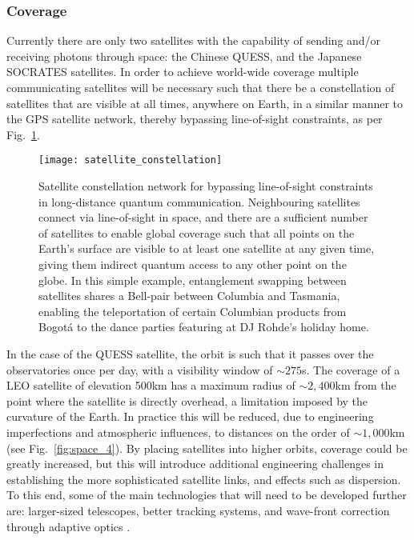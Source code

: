 %
%

\subsubsection{Coverage}

Currently there are only two satellites with the capability of sending and/or receiving photons through space: the Chinese QUESS, and the Japanese SOCRATES satellites. In order to achieve world-wide coverage multiple communicating satellites will be necessary such that there be a constellation of satellites that are visible at all times, anywhere on Earth, in a similar manner to the GPS satellite network, thereby bypassing line-of-sight constraints, as per Fig.~\ref{fig:sat_constellation}.

\begin{figure}[!htb]
	\texttt{[image: satellite\_constellation]}
	\caption{Satellite constellation network for bypassing line-of-sight constraints in long-distance quantum communication. Neighbouring satellites connect via line-of-sight in space, and there are a sufficient number of satellites to enable global coverage such that all points on the Earth's surface are visible to at least one satellite at any given time, giving them indirect quantum access to any other point on the globe. In this simple example, entanglement swapping between satellites shares a Bell-pair between Columbia and Tasmania, enabling the teleportation of certain Columbian products from Bogot{\'a} to the dance parties featuring at DJ Rohde's holiday home.} \label{fig:sat_constellation}
\end{figure}

In the case of the QUESS satellite, the orbit is such that it passes over the observatories once per day, with a visibility window of $\sim 275$s. The coverage of a LEO satellite of elevation 500km has a maximum radius of $\sim 2,400$km from the point where the satellite is directly overhead, a limitation imposed by the curvature of the Earth. In practice this will be reduced, due to engineering imperfections and atmospheric influences, to distances on the order of $\sim 1,000$km (see Fig.~\ref{fig:space_4}). By placing satellites into higher orbits, coverage could be greatly increased, but this will introduce additional engineering challenges in establishing the more sophisticated satellite links, and effects such as dispersion. To this end, some of the main technologies that will need to be developed further are: larger-sized telescopes, better tracking systems, and wave-front correction through adaptive optics \cite{bib:liao2017satellite}.

